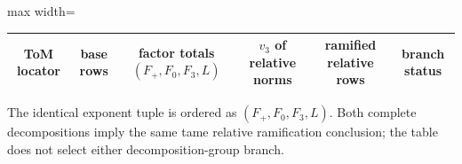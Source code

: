 \begingroup
\small
\setlength{\tabcolsep}{5pt}
\renewcommand{\arraystretch}{1.16}
\begin{adjustbox}{max width=\linewidth}
\begin{tabular}{@{}cccccc@{}}
\toprule
ToM locator & base rows & factor totals $(F_+,F_0,F_3,L)$ &
$v_3$ of relative norms & ramified relative rows & branch status \\
\midrule
%
\end{tabular}
\end{adjustbox}
\par\smallskip
\footnotesize The identical exponent tuple is ordered as
$(F_+,F_0,F_3,L)$.  Both complete decompositions imply the same tame relative
ramification conclusion; the table does not select either decomposition-group
branch.
\endgroup
